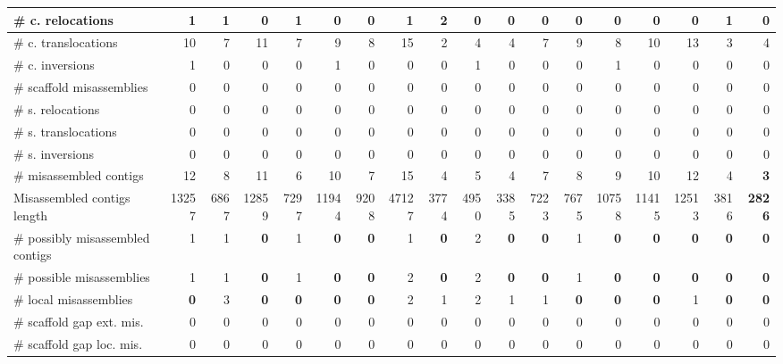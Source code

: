 \documentclass[12pt,a4paper]{article}
\begin{document}
\begin{table}[ht]
\begin{center}
\begin{tabular}{|l*{17}{|r}|}
\hspace{5mm}\# c. relocations & 1 & 1 & 0 & 1 & 0 & 0 & 1 & 2 & 0 & 0 & 0 & 0 & 0 & 0 & 0 & 1 & 0 \\ \hline
\hspace{5mm}\# c. translocations & 10 & 7 & 11 & 7 & 9 & 8 & 15 & 2 & 4 & 4 & 7 & 9 & 8 & 10 & 13 & 3 & 4 \\ \hline
\hspace{5mm}\# c. inversions & 1 & 0 & 0 & 0 & 1 & 0 & 0 & 0 & 1 & 0 & 0 & 0 & 1 & 0 & 0 & 0 & 0 \\ \hline
\hspace{2mm}\# scaffold misassemblies & 0 & 0 & 0 & 0 & 0 & 0 & 0 & 0 & 0 & 0 & 0 & 0 & 0 & 0 & 0 & 0 & 0 \\ \hline
\hspace{5mm}\# s. relocations & 0 & 0 & 0 & 0 & 0 & 0 & 0 & 0 & 0 & 0 & 0 & 0 & 0 & 0 & 0 & 0 & 0 \\ \hline
\hspace{5mm}\# s. translocations & 0 & 0 & 0 & 0 & 0 & 0 & 0 & 0 & 0 & 0 & 0 & 0 & 0 & 0 & 0 & 0 & 0 \\ \hline
\hspace{5mm}\# s. inversions & 0 & 0 & 0 & 0 & 0 & 0 & 0 & 0 & 0 & 0 & 0 & 0 & 0 & 0 & 0 & 0 & 0 \\ \hline
\# misassembled contigs & 12 & 8 & 11 & 6 & 10 & 7 & 15 & 4 & 5 & 4 & 7 & 8 & 9 & 10 & 12 & 4 & {\bf 3} \\ \hline
Misassembled contigs length & 13257 & 6867 & 12859 & 7297 & 11944 & 9208 & 47127 & 3774 & 4950 & 3385 & 7223 & 7675 & 10758 & 11415 & 12513 & 3816 & {\bf 2826} \\ \hline
\# possibly misassembled contigs & 1 & 1 & {\bf 0} & 1 & {\bf 0} & {\bf 0} & 1 & {\bf 0} & 2 & {\bf 0} & {\bf 0} & 1 & {\bf 0} & {\bf 0} & {\bf 0} & {\bf 0} & {\bf 0} \\ \hline
\hspace{5mm}\# possible misassemblies & 1 & 1 & {\bf 0} & 1 & {\bf 0} & {\bf 0} & 2 & {\bf 0} & 2 & {\bf 0} & {\bf 0} & 1 & {\bf 0} & {\bf 0} & {\bf 0} & {\bf 0} & {\bf 0} \\ \hline
\# local misassemblies & {\bf 0} & 3 & {\bf 0} & {\bf 0} & {\bf 0} & {\bf 0} & 2 & 1 & 2 & 1 & 1 & {\bf 0} & {\bf 0} & {\bf 0} & 1 & {\bf 0} & {\bf 0} \\ \hline
\# scaffold gap ext. mis. & 0 & 0 & 0 & 0 & 0 & 0 & 0 & 0 & 0 & 0 & 0 & 0 & 0 & 0 & 0 & 0 & 0 \\ \hline
\# scaffold gap loc. mis. & 0 & 0 & 0 & 0 & 0 & 0 & 0 & 0 & 0 & 0 & 0 & 0 & 0 & 0 & 0 & 0 & 0 \\ \hline

\end{tabular}
\end{center}
\end{table}
\end{document}

